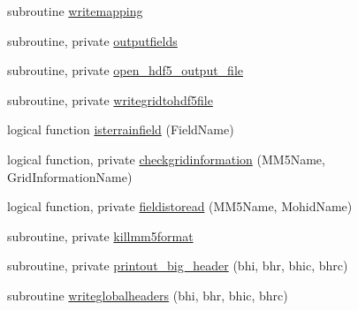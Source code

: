 \begin{DoxyCompactItemize}
\item 
subroutine \mbox{\hyperlink{namespacemodulemm5format_ab8eb4353dbcd1d51f336675a6f66b0e6}{writemapping}}
\item 
subroutine, private \mbox{\hyperlink{namespacemodulemm5format_a3cfd45468121f8166d1e004ee05a5b0b}{outputfields}}
\item 
subroutine, private \mbox{\hyperlink{namespacemodulemm5format_aeb412a3427b8b95fd51d277cd343e346}{open\+\_\+hdf5\+\_\+output\+\_\+file}}
\item 
subroutine, private \mbox{\hyperlink{namespacemodulemm5format_a752f2b2f864f9d5601283baf96f7397f}{writegridtohdf5file}}
\item 
logical function \mbox{\hyperlink{namespacemodulemm5format_ae5ec2f854445619a5a7132875dc4d803}{isterrainfield}} (Field\+Name)
\item 
logical function, private \mbox{\hyperlink{namespacemodulemm5format_af3c3e0015f7df36b0498d741f6d745c3}{checkgridinformation}} (M\+M5\+Name, Grid\+Information\+Name)
\item 
logical function, private \mbox{\hyperlink{namespacemodulemm5format_a0fb6edd1ddbebdd980a7396df7323e1a}{fieldistoread}} (M\+M5\+Name, Mohid\+Name)
\item 
subroutine, private \mbox{\hyperlink{namespacemodulemm5format_a2c04440614e11a95fbe1732cd8110590}{killmm5format}}
\item 
subroutine, private \mbox{\hyperlink{namespacemodulemm5format_a406c18c9d5a54d074a43f1f1252ebdde}{printout\+\_\+big\+\_\+header}} (bhi, bhr, bhic, bhrc)
\item 
subroutine \mbox{\hyperlink{namespacemodulemm5format_a56429c53d699bf7bc1af81bd292f7d95}{writeglobalheaders}} (bhi, bhr, bhic, bhrc)
\end{DoxyCompactItemize}
